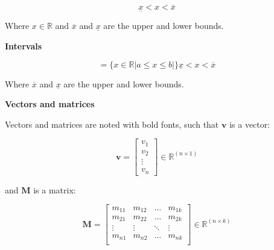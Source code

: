 \begin{equation}
\underline{x} < x < \overline{x} 
\end{equation}

 Where $x \in {\mathbb{R}} $ and $\overline{x}$ and $\underline{x}$ are the upper and lower bounds.
 
 \textbf{Intervals}

\begin{equation}
	[a,b] =  \{x \in \mathbb{R}|a\leq x \leq b|\}
\underline{x} < x < \overline{x} 
\end{equation}

 Where $\overline{x}$ and $\underline{x}$ are the upper and lower bounds.

 \textbf{Vectors and matrices}

Vectors and matrices are noted with bold fonts, such that $\bm{v}$ is a vector:

\begin{equation}
\bm{v} = 
\begin{bmatrix}

		 v_1 	\\
		 v_2 	\\
		 \vdots \\
		 v_n

\end{bmatrix}
\in \pmb{{\mathbb{R}}}^{(n \times 1)}
\end{equation}

and $\bm{M}$ is a matrix:

\begin{equation}
\bm{M} = 
\begin{bmatrix}

		 m_{11} & m_{12} & \hdots & m_{1k}	\\
		 m_{21} & m_{22} & \hdots & m_{2k}	\\
		 \vdots & \vdots & \ddots & \vdots	\\
		 m_{n1} & m_{n2} & \hdots &m_{nk} \\

\end{bmatrix}
\in \pmb{{\mathbb{R}}}^{(n \times k)}
\end{equation}




